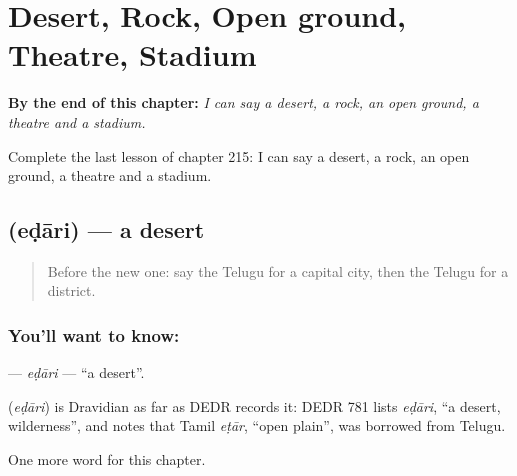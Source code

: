 
\chapter{Desert, Rock, Open ground, Theatre, Stadium}
\label{ch:te-desert-rock-open-ground-theatre-stadium}

\begin{chapteropening}
\textbf{By the end of this chapter:} \emph{I can say a desert, a rock, an open ground, a theatre and a stadium.}

Complete the last lesson of chapter 215: I can say a desert, a rock, an open ground, a theatre and a stadium.
\end{chapteropening}

\section[\texorpdfstring{\te{ఎడారి} (eḍāri)}{ఎడారి (eḍāri)}]{ (eḍāri) — a desert}

\label{lesson:TE-C215-edari}



\begin{quote}
Before the new one: say the Telugu for a capital city, then the Telugu for a district.
\end{quote}

\subsection*{You'll want to know: }
\textbf{} — \emph{eḍāri} — \textquotedblleft{}a desert\textquotedblright{}.

\begin{cousinweb}
\textbf{} (\emph{eḍāri}) is Dravidian as far as DEDR records it: DEDR 781 lists \emph{eḍāri}, \textquotedblleft{}a desert, wilderness\textquotedblright{}, and notes that Tamil \emph{eṭār}, \textquotedblleft{}open plain\textquotedblright{}, was borrowed from Telugu.
\end{cousinweb}

\begin{grammarlens}[title={What you've built}]
One more word for this chapter.
\end{grammarlens}

